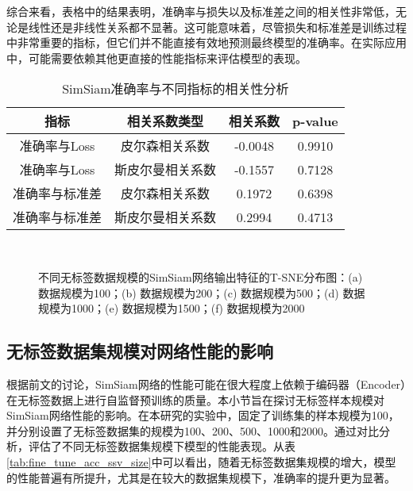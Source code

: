 \documentclass[master]{thesis-uestc}
\begin{document}
综合来看，表格中的结果表明，准确率与损失以及标准差之间的相关性非常低，无论是线性还是非线性关系都不显著。这可能意味着，尽管损失和标准差是训练过程中非常重要的指标，但它们并不能直接有效地预测最终模型的准确率。在实际应用中，可能需要依赖其他更直接的性能指标来评估模型的表现。

\begin{table}
    \centering
    \caption{SimSiam准确率与不同指标的相关性分析}
    \begin{tabular}{cccc}
    \toprule
    \textbf{指标} & \textbf{相关系数类型} & \textbf{相关系数} & \textbf{p-value} \\
    \midrule
    准确率与Loss     & 皮尔森相关系数   & -0.0048 & 0.9910 \\
    准确率与Loss     & 斯皮尔曼相关系数 & -0.1557 & 0.7128 \\
    准确率与标准差      & 皮尔森相关系数   & 0.1972 & 0.6398 \\
    准确率与标准差      & 斯皮尔曼相关系数 & 0.2994 & 0.4713 \\
    \bottomrule
    \end{tabular}
    \label{tab:correlation_with_acc}
    \end{table}

\begin{figure}[h]
    \centering
    \\
    
    \caption{不同无标签数据规模的SimSiam网络输出特征的T-SNE分布图：(a) 数据规模为100；(b) 数据规模为200；(c) 数据规模为500；(d) 数据规模为1000；(e) 数据规模为1500；(f) 数据规模为2000}
    \label{tsne_diff_ssv_size}
\end{figure}
\subsection{无标签数据集规模对网络性能的影响}
根据前文的讨论，SimSiam网络的性能可能在很大程度上依赖于编码器（Encoder）在无标签数据上进行自监督预训练的质量。本小节旨在探讨无标签样本规模对SimSiam网络性能的影响。在本研究的实验中，固定了训练集的样本规模为100，并分别设置了无标签数据集的规模为100、200、500、1000和2000。通过对比分析，评估了不同无标签数据集规模下模型的性能表现。从表\ref{tab:fine_tune_acc_ssv_size}中可以看出，随着无标签数据集规模的增大，模型的性能普遍有所提升，尤其是在较大的数据集规模下，准确率的提升更为显著。
\end{document}
